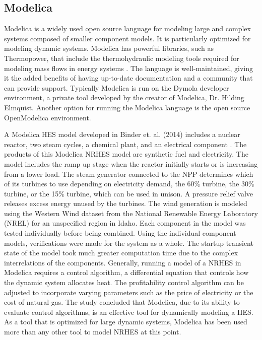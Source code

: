 \documentclass[12pt]{UIdahoMastersThesis}
\begin{document}
\subsection{Modelica}
Modelica is a widely used open source language for modeling large and complex systems composed of smaller component models. It is particularly optimized for modeling dynamic systems. Modelica has powerful libraries, such as Thermopower, that include the thermohydraulic modeling tools required for modeling mass flows in energy systems \cite{Binder2014}. The language is well-maintained, giving it the added benefits of having up-to-date documentation and a community that can provide support. Typically Modelica is run on the Dymola developer environment, a private tool developed by the creator of Modelica, Dr. Hilding Elmquist. Another option for running the Modelica language is the open source OpenModelica environment.

A Modelica HES model developed in Binder et. al. (2014) includes a nuclear reactor, two steam cycles, a chemical plant, and an electrical component \cite{Binder2014}. The products of this Modelica NRHES model are synthetic fuel and electricity. The model includes the ramp up stage when the reactor initially starts or is increasing from a lower load. The steam generator connected to the NPP determines which of its turbines to use depending on electricity demand, the 60\% turbine, the 30\% turbine, or the 15\% turbine, which can be used in unison. A pressure relief valve releases excess energy unused by the turbines. The wind generation is modeled using the Western Wind dataset from the National Renewable Energy Laboratory (NREL) for an unspecified region in Idaho. Each component in the model was tested individually before being combined. Using the individual component models, verifications were made for the system as a whole. The startup transient state of the model took much greater computation time due to the complex interrelations of the components. Generally, running a model of a NRHES in Modelica requires a control algorithm, a differential equation that controls how the dynamic system allocates heat. The profitability control algorithm can be adjusted to incorporate varying parameters such as the price of electricity or the cost of natural gas. The study concluded that Modelica, due to its ability to evaluate control algorithms, is an effective tool for dynamically modeling a HES. As a tool that is optimized for large dynamic systems, Modelica has been used more than any other tool to model NRHES at this point.
\end{document}

